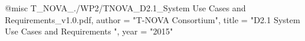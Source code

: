 @misc{ T_NOVA_./WP2/TNOVA_D2.1_System Use Cases and Requirements_v1.0.pdf,
       author = "T-NOVA Consortium",
       title = "D2.1 System Use Cases and Requirements ",
       year = "2015" }
